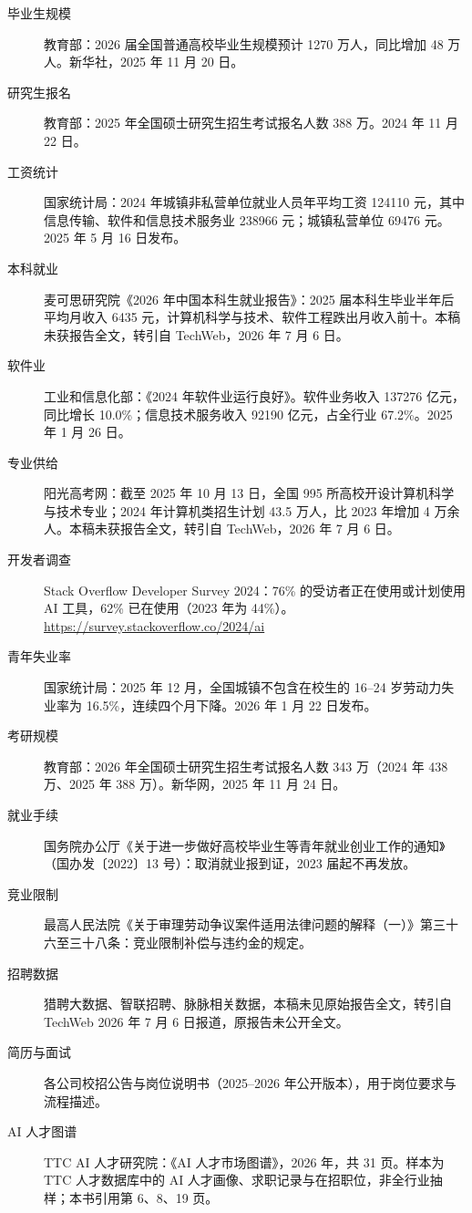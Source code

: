\documentclass[UTF8,zihao=5,openany]{ctexbook}
\begin{document}
{\small
\begin{description}
\item[毕业生规模] 教育部：2026 届全国普通高校毕业生规模预计 1270 万人，同比增加 48 万人。新华社，2025 年 11 月 20 日。
\item[研究生报名] 教育部：2025 年全国硕士研究生招生考试报名人数 388 万。2024 年 11 月 22 日。
\item[工资统计] 国家统计局：2024 年城镇非私营单位就业人员年平均工资 124110 元，其中信息传输、软件和信息技术服务业 238966 元；城镇私营单位 69476 元。2025 年 5 月 16 日发布。
\item[本科就业] 麦可思研究院《2026 年中国本科生就业报告》：2025 届本科生毕业半年后平均月收入 6435 元，计算机科学与技术、软件工程跌出月收入前十。本稿未获报告全文，转引自 TechWeb，2026 年 7 月 6 日。
\item[软件业] 工业和信息化部：《2024 年软件业运行良好》。软件业务收入 137276 亿元，同比增长 10.0\%；信息技术服务收入 92190 亿元，占全行业 67.2\%。2025 年 1 月 26 日。
\item[专业供给] 阳光高考网：截至 2025 年 10 月 13 日，全国 995 所高校开设计算机科学与技术专业；2024 年计算机类招生计划 43.5 万人，比 2023 年增加 4 万余人。本稿未获报告全文，转引自 TechWeb，2026 年 7 月 6 日。
\item[开发者调查] Stack Overflow Developer Survey 2024：76\% 的受访者正在使用或计划使用 AI 工具，62\% 已在使用（2023 年为 44\%）。\url{https://survey.stackoverflow.co/2024/ai}
\item[青年失业率] 国家统计局：2025 年 12 月，全国城镇不包含在校生的 16--24 岁劳动力失业率为 16.5\%，连续四个月下降。2026 年 1 月 22 日发布。
\item[考研规模] 教育部：2026 年全国硕士研究生招生考试报名人数 343 万（2024 年 438 万、2025 年 388 万）。新华网，2025 年 11 月 24 日。
\item[就业手续] 国务院办公厅《关于进一步做好高校毕业生等青年就业创业工作的通知》（国办发〔2022〕13 号）：取消就业报到证，2023 届起不再发放。
\item[竞业限制] 最高人民法院《关于审理劳动争议案件适用法律问题的解释（一）》第三十六至三十八条：竞业限制补偿与违约金的规定。
\item[招聘数据] 猎聘大数据、智联招聘、脉脉相关数据，本稿未见原始报告全文，转引自 TechWeb 2026 年 7 月 6 日报道，原报告未公开全文。
\item[简历与面试] 各公司校招公告与岗位说明书（2025--2026 年公开版本），用于岗位要求与流程描述。
\item[AI 人才图谱] TTC AI 人才研究院：《AI 人才市场图谱》，2026 年，共 31 页。样本为 TTC 人才数据库中的 AI 人才画像、求职记录与在招职位，非全行业抽样；本书引用第 6、8、19 页。

\end{description}}
\end{document}
